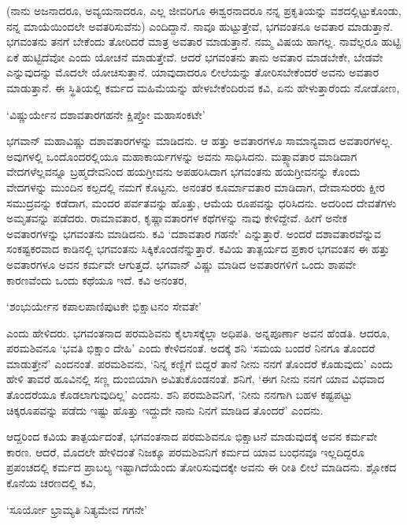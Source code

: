 (ನಾನು ಅಜನಾದರೂ, ಅವ್ಯಯನಾದರೂ, ಎಲ್ಲ ಜೀವರಿಗೂ ಈಶ್ವರನಾದರೂ ನನ್ನ ಪ್ರಕೃತಿಯನ್ನು ವಶದಲ್ಲಿಟ್ಟುಕೊಂಡು, ನನ್ನ ಮಾಯೆಯಿಂದಲೇ ಅವತರಿಸುವೆನು) ಎಂದಿದ್ದಾನೆ. ನಾವೂ ಹುಟ್ಟುತ್ತೇವೆ, ಭಗವಂತನೂ ಅವತಾರ ಮಾಡುತ್ತಾನೆ. ಭಗವಂತನು ತನಗೆ ಬೇಕೆಂದು ತೋರಿದರೆ ಮಾತ್ರ ಅವತಾರ ಮಾಡುತ್ತಾನೆ. ನಮ್ಮ ವಿಷಯ ಹಾಗಲ್ಲ. ನಾವೆಲ್ಲರೂ ಹುಟ್ಟಿ ಏಕೆ ಹುಟ್ಟಿದೆವೋ ಎಂದು ಯೋಚನೆ ಮಾಡುತ್ತೇವೆ. ಆದರೆ ಭಗವಂತನು ತಾನು ಅವತಾರ ಮಾಡಬೇಕೇ, ಬೇಡವೇ ಎನ್ನುವುದನ್ನು ಮೊದಲೇ ಯೋಚಿಸುತ್ತಾನೆ. ಯಾವುದಾದರೂ ಲೀಲೆಯನ್ನು ತೋರಿಸಬೇಕೆಂದರೆ ಅವನು ಅವತಾರ ಮಾಡುತ್ತಾನೆ. ಈ ಸ್ಥಿತಿಯಲ್ಲಿ ಕರ್ಮದ ಮಹಿಮೆಯನ್ನು ಹೇಳಬೇಕೆಂದಿರುವ ಕವಿ, ಏನು ಹೇಳುತ್ತಾರೆಂದು ನೋಡೋಣ,

\begin{shloka}
`ವಿಷ್ಣುರ್ಯೇನ ದಶಾವತಾರಗಹನೇ ಕ್ಷಿಪ್ತೋ ಮಹಾಸಂಕಟೇ'
\end{shloka}

ಭಗವಾನ್ ಮಹಾವಿಷ್ಣು ದಶಾವತಾರಗಳನ್ನು ಮಾಡಿದನು. ಆ ಹತ್ತು ಅವತಾರಗಳೂ ಸಾಮಾನ್ಯವಾದ ಅವತಾರಗಳಲ್ಲ. ಅವುಗಳಲ್ಲಿ ಒಂದೊಂದರಲ್ಲಿಯೂ ಮಹಾಕಾರ್ಯಗಳನ್ನು ಅವನು ಸಾಧಿಸಿದನು. ಮತ್ಸ್ಯಾವತಾರ ಮಾಡಿದಾಗ ವೇದಗಳೆಲ್ಲವನ್ನೂ ಬ್ರಹ್ಮದೇವನಿಂದ ಹಯಗ್ರೀವನು ಅಪಹರಿಸಿದಾಗ ಭಗವಂತನು ಹಯಗ್ರೀವನನ್ನು ಕೊಂದು ವೇದಗಳನ್ನು ಮುಂದಿನ ಕಲ್ಪದಲ್ಲಿ ನಮಗೆ ಕೊಟ್ಟನು. ಅನಂತರ ಕೂರ್ಮಾವತಾರ ಮಾಡಿದಾಗ, ದೇವಾಸುರರು ಕ್ಷೀರ ಸಮುದ್ರವನ್ನು ಕಡೆದಾಗ, ಮಂದರ ಪರ್ವತವನ್ನು ಹೊತ್ತು, ಆಮೆಯ ರೂಪವನ್ನು ಧರಿಸಿದನು. ಅದರಿಂದ ದೇವತೆಗಳು ಅಮೃತವನ್ನು ಪಡೆದರು. ರಾಮಾವತಾರ, ಕೃಷ್ಣಾವತಾರಗಳ ಕಥೆಗಳನ್ನು ನಾವು ಕೇಳಿದ್ದೇವೆ. ಹೀಗೆ ಅನೇಕ ಅವತಾರಗಳನ್ನು ಭಗವಂತನು ಮಾಡಿದನು. ಕವಿ `ದಶಾವತಾರ ಗಹನೇ' ಎನ್ನುತ್ತಾರೆ. ಅಂದರೆ ದಶಾವತಾರವೆನ್ನುವ ಸಂಕಷ್ಟಕರವಾದ ಕಾಡಿನಲ್ಲಿ ಭಗವಂತನು ಸಿಕ್ಕಿಕೊಂಡನೆನ್ನುತ್ತಾರೆ. ಕವಿಯ ತಾತ್ಪರ್ಯದ ಪ್ರಕಾರ ಭಗವಂತನ ಈ ಹತ್ತು ಅವತಾರಗಳೂ ಅವನ ಕರ್ಮವೇ ಆಗುತ್ತದೆ. ಭಗವಾನ್ ವಿಷ್ಣು ಮಾಡಿದ ಅವತಾರಗಳಿಗೆ ಒಂದು ಶಾಪವೇ ಕಾರಣವೆಂದು ಒಂದು ಕಥೆಯೂ ಇದೆ. ಕವಿ ಅನಂತರ,

\begin{shloka}
`ಶಂಭುರ್ಯೇನ ಕಪಾಲಪಾಣಿಪುಟಕೇ ಭಿಕ್ಷಾಟನಂ ಸೇವತೇ'
\end{shloka}

ಎಂದು ಹೇಳಿದರು. ಭಗವಂತನಾದ ಪರಮಶಿವನು ಕೈಲಾಸಕ್ಕೆಲ್ಲಾ ಅಧಿಪತಿ. ಅನ್ನಪೂರ್ಣಾ ಅವನ ಹೆಂಡತಿ. ಆದರೂ, ಪರಮಶಿವನೂ `ಭವತಿ ಭಿಕ್ಷಾಂ ದೇಹಿ' ಎಂದು ಕೇಳಿದನಂತೆ. ಅದಕ್ಕೆ ಶನಿ `ಸಮಯ ಬಂದರೆ ನಿನಗೂ ತೊಂದರೆ ಮಾಡುತ್ತೇನೆ' ಎಂದನಂತೆ. ಪರಮಶಿವನು, `ನಿನ್ನ ಕಣ್ಣಿಗೆ ಬಿದ್ದರೆ ತಾನೆ ನೀನು ನನಗೆ ತೊಂದರೆ ಕೊಡುವುದು' ಎಂದು ಹೇಳಿ ತಾವರೆ ಹೂವಿನಲ್ಲಿ ಸಣ್ಣ ದುಂಬಿಯಾಗಿ ಅವಿತುಕೊಂಡನಂತೆ. ಶನಿಗೆ, `ಈಗ ನೀನು ನನಗೆ ಯಾವ ವಿಧವಾದ ತೊಂದರೆಯೂ ಕೊಡಲಾಗುವುದಿಲ್ಲ' ಎಂದನು. ಶನಿ ಪರಮಶಿವನಿಗೆ, `ನೀನು ನನಗಾಗಿ ಬಹಳ ಕಷ್ಟಪಟ್ಟು ಚಿಕ್ಕರೂಪವನ್ನು ಪಡೆದು ಇಷ್ಟು ಹೊತ್ತು ಇದ್ದುದೇ ನಾನು ನಿನಗೆ ಮಾಡಿದ ತೊಂದರೆ' ಎಂದನು.

ಆದ್ದರಿಂದ ಕವಿಯ ತಾತ್ಪರ್ಯದಂತೆ, ಭಗವಂತನಾದ ಪರಮಶಿವನೂ ಭಿಕ್ಷಾಟನೆ ಮಾಡುವುದಕ್ಕೆ ಅವನ ಕರ್ಮವೇ ಕಾರಣ. ಆದರೆ, ಮೊದಲೇ ಹೇಳಿದಂತೆ ನಿಜಕ್ಕೂ ಪರಮಶಿವನಿಗೆ ಕರ್ಮದ ಯಾವ ಬಂಧನವೂ ಇಲ್ಲದಿದ್ದರೂ ಪ್ರಪಂಚದಲ್ಲಿ ಕರ್ಮದ ಪ್ರಾಬಲ್ಯ ಇಷ್ಟಾಗಿದೆಯೆಂದು ತೋರಿಸುವುದಕ್ಕೇ ಅವನು ಈ ರೀತಿ ಲೀಲೆ ಮಾಡಿದನು. ಶ್ಲೋಕದ ಕೊನೆಯ ಚರಣದಲ್ಲಿ ಕವಿ,

\begin{shloka}
`ಸೂರ್ಯೋ ಭ್ರಾಮ್ಯತಿ ನಿತ್ಯಮೇವ ಗಗನೇ'
\end{shloka}

